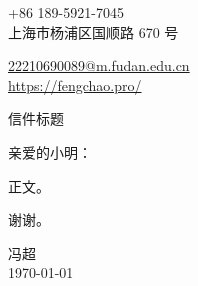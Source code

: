 \documentclass[a4paper]{letter}
\makeatletter
\newcommand{\lettertitle}{信件标题}
\newcommand{\yourphone}{+86 189-5921-7045}
\newcommand{\youraddress}{上海市杨浦区国顺路 670 号}
\newcommand{\youremail}{22210690089@m.fudan.edu.cn}
\newcommand{\yourweb}{https://fengchao.pro/}
\makeatother
\begin{document}
\begin{flushleft}
    \yourphone\\
    \youraddress
\end{flushleft}

\vspace{-46pt}

\begin{flushright}
    \href{mailto:\youremail}{\youremail}\\
    \href{\yourweb}{\yourweb}
\end{flushright}

\begin{center}
    \LARGE\lettertitle
\end{center}

\bigskip

\par \noindent 亲爱的小明：
\par 正文。
\par 谢谢。

\par \begin{flushright}
    冯超\\
    \today
\end{flushright}
\end{document}
